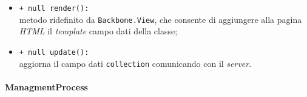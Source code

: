 \begin{flushleft}
\begin{itemize}
\begin{sloppypar}
\begin{itemize}
\item \texttt{+ null render():}\\ metodo ridefinito da \texttt{Backbone.View}, che consente di aggiungere alla pagina \textit{HTML} il \textit{template} campo dati della classe;
\item \texttt{+ null update():}\\ aggiorna il campo dati \texttt{collection} comunicando con il \textit{server}.
\end{itemize}
\end{sloppypar}
\end{itemize}
\end{flushleft}

\paragraph{ManagmentProcess}
\label{managementProcessU}
